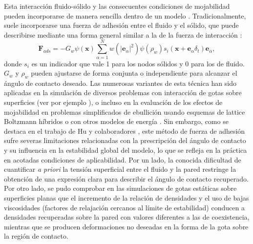 Esta interacci\'on fluido-s\'olido y las consecuentes condiciones de mojabilidad pueden incorporarse de manera sencilla dentro de un modelo \pp{}. Tradicionalmente, suele incorporarse una fuerza de adhesi\'on entre el fluido y el s\'olido, que puede describirse mediante una forma general similar a la de la fuerza de interacci\'on \cite{chen_critical_2014}:
\begin{equation}
	\bm{F}_{ads}= -G_w \psi(\bm{x}) \sum_{\alpha=1}^{N} w(|\bm{e}_{\alpha}|^2)\psi(\rho_w) s_i(\bm{x}+\bm{e}_{\alpha}\delta_t)\bm{e}_{\alpha},
\end{equation}
donde $s_i$ es un indicador que vale 1 para los nodos s\'olidos y 0 para los de fluido. $G_w$ y $\rho_w$ pueden ajustarse de forma conjunta o independiente para alcanzar el \'angulo de contacto deseado. Las numerosas variantes de esta t\'ecnica han sido aplicadas en la simulaci\'on de diversos problemas con interacci\'on de gotas sobre superficies (ver por ejemplo \cite{li_contact_2014, xu_three-dimensional_2015, sbragaglia_surface_2006}), o incluso en la evaluaci\'on de los efectos de mojabilidad en problemas simplificados de ebullici\'on usando esquemas de lattice Boltzmann h\'ibridos o con otros modelos de energ\'ia \cite{li_lattice_2016, ma_numerical_2019, guo_3d_2019}. Sin embargo, como se destaca en el trabajo de Hu y colaboradores \cite{hu_contact_2016}, este m\'etodo de fuerza de adhesi\'on sufre severas limitaciones relacionadas con la prescripci\'on del \'angulo de contacto y su influencia en la estabilidad global del modelo, lo que se refleja en la pr\'actica en acotadas condiciones de aplicabilidad. Por un lado, la conocida dificultad de cuantificar \emph{a priori} la tensi\'on superficial entre el fluido y la pared restringe la obtenci\'on de una expresi\'on clara para describir el \'angulo de contacto recuperado. Por otro lado, se pudo comprobar en las simulaciones de gotas est\'aticas sobre superficies planas que el incremento de la relaci\'on de densidades y el uso de bajas viscosidades (factores de relajaci\'on cercanos al l\'imite de estabilidad) conducen a densidades recuperadas sobre la pared con valores diferentes a las de coexistencia, mientras que se producen deformaciones no deseadas en la forma de la gota sobre la regi\'on de contacto.

